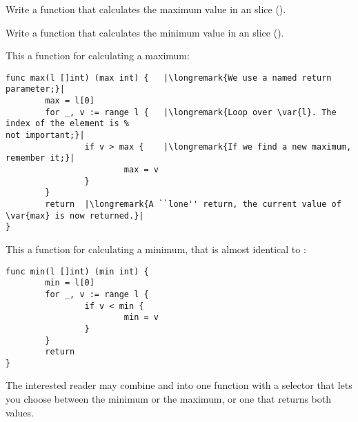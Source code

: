 \begin{Exercise}[title={Minimum and maximum},difficulty=0]
\label{ex:minmax}
\Question\label{ex:minmax q1} Write a function that calculates the
maximum value in an  slice ().

\Question\label{ex:minmax q2} Write a function that calculates the
minimum value in an  slice ().

\end{Exercise}

\begin{Answer}
\Question This a function for calculating a maximum:
\begin{lstlisting}
func max(l []int) (max int) {   |\longremark{We use a named return parameter;}|
        max = l[0]      
        for _, v := range l {   |\longremark{Loop over \var{l}. The index of the element is %
not important;}|
                if v > max {    |\longremark{If we find a new maximum, remember it;}|
                        max = v 
                }   
        }   
        return  |\longremark{A ``lone'' return, the current value of \var{max} is now returned.}|
}
\end{lstlisting}
\showremarks

\Question This a function for calculating a minimum, that is almost identical to :
\begin{lstlisting}
func min(l []int) (min int) {
        min = l[0]
        for _, v := range l { 
                if v < min {
                        min = v 
                }   
        }   
        return
}
\end{lstlisting}
The interested reader may combine  and  into one function with a selector
that lets you choose between the minimum or the maximum, or one that returns both values.
\end{Answer}
